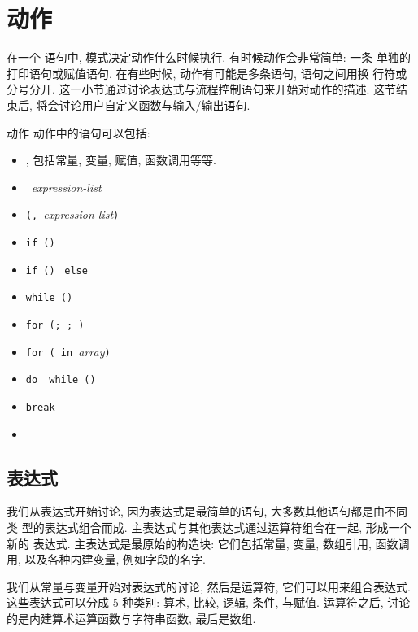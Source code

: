 \section{动作}
\label{sec:actions}

在一个 \patact 语句中, 模式决定动作什么时候执行. 有时候动作会非常简单: 一条
单独的打印语句或赋值语句. 在有些时候, 动作有可能是多条语句, 语句之间用换
行符或分号分开. 这一小节通过讨论表达式与流程控制语句来开始对动作的描述.
这节结束后, 将会讨论用户自定义函数与输入/输出语句.
\begin{summary}{动作}
    动作中的语句可以包括:
    \begin{itemize}
\item[] \indent      \expr, 包括常量, 变量, 赋值, 函数调用等等.
\item[] \indent      \print\ \textit{expression-list}
\item[] \indent      \printf\verb'('\fmt\verb', '\textit{expression-list}\verb')'
\item[] \indent      \verb'if ('\expr\verb')' \stmt
\item[] \indent      \verb'if ('\expr\verb')' \stmt\ \verb'else '\stmt
\item[] \indent      \verb'while ('\expr\verb') '\stmt
\item[] \indent      \verb'for ('\expr\verb'; '\expr\verb'; '\expr\verb') '\stmt
\item[] \indent      \verb'for ('\expr\verb' in '\textit{array}\verb')' \stmt
\item[] \indent      \verb'do '\stmt\ \verb'while ('\expr\verb')'
\item[] \indent      \texttt{break}
\item[] \indent      \ctn
    \end{itemize}
\end{summary}

\subsection{表达式}
\label{subsec:expressions}

我们从表达式开始讨论, 因为表达式是最简单的语句, 大多数其他语句都是由不同类
型的表达式组合而成. 主表达式与其他表达式通过运算符组合在一起, 形成一个新的
表达式. 主表达式是最原始的构造块: 它们包括常量, 变量, 数组引用, 函数调用,
以及各种内建变量, 例如字段的名字.

我们从常量与变量开始对表达式的讨论, 然后是运算符, 它们可以用来组合表达式.
这些表达式可以分成 5 种类别: 算术, 比较, 逻辑, 条件, 与赋值. 运算符之后,
讨论的是内建算术运算函数与字符串函数, 最后是数组.


